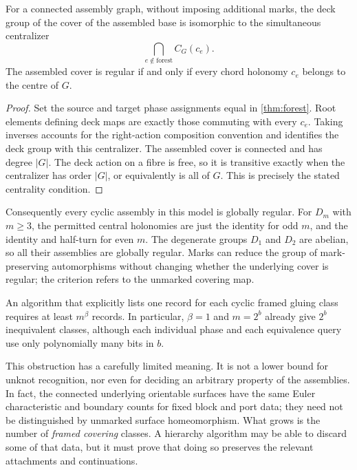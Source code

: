 \begin{corollary}
\label{cor:global-regularity}
For a connected assembly graph, without imposing additional marks, the
deck group of the cover of the assembled base is isomorphic to the
simultaneous centralizer
\[
 \bigcap_{e\notin\text{forest}} C_G(c_e).
\]
The assembled cover is regular if and only if every chord holonomy $c_e$
belongs to the centre of $G$.
\end{corollary}
\begin{proof}
Set the source and target phase assignments equal in
\cref{thm:forest}. Root elements defining deck maps are exactly those
commuting with every $c_e$. Taking inverses accounts for the right-action
composition convention and identifies the deck group with this
centralizer. The assembled cover is connected and has degree $|G|$.
The deck action on a fibre is free, so it is transitive exactly when the
centralizer has order $|G|$, or equivalently is all of $G$. This is precisely
the stated centrality condition.
\end{proof}

Consequently every cyclic assembly in this model is globally regular.
For $D_m$ with $m\geq3$, the permitted central holonomies are just the
identity for odd $m$, and the identity and half-turn for even $m$.
The degenerate groups $D_1$ and $D_2$ are abelian, so all their assemblies
are globally regular. Marks can reduce the group of mark-preserving
automorphisms without changing whether the underlying cover is regular;
the criterion refers to the unmarked covering map.

\begin{corollary}
\label{cor:gluing-obstruction}
An algorithm that explicitly lists one record for each cyclic framed gluing
class requires at least $m^\beta$ records. In particular, $\beta=1$ and
$m=2^b$ already give $2^b$ inequivalent classes, although each individual
phase and each equivalence query use only polynomially many bits in $b$.
\end{corollary}

This obstruction has a carefully limited meaning. It is not a lower bound
for unknot recognition, nor even for deciding an arbitrary property of the
assemblies. In fact, the connected underlying orientable surfaces have the
same Euler characteristic and boundary counts for fixed block and port data;
they need not be distinguished by unmarked surface homeomorphism. What grows
is the number of \emph{framed covering} classes. A hierarchy algorithm may
be able to discard some of that data, but it must prove that doing so
preserves the relevant attachments and continuations.

